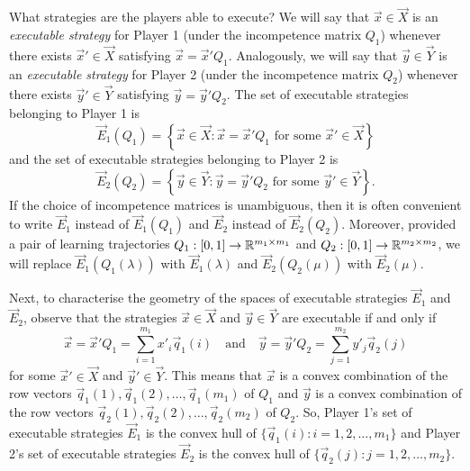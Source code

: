     What strategies are the players able to execute?
    We will say that $\vec{x} \in \vec{X}$ is an \emph{executable strategy} for Player 1 (under the incompetence matrix $Q_1$) whenever there exists $\vec{x}' \in \vec{X}$ satisfying $\vec{x} = \vec{x}' Q_1$.
    Analogously, we will say that $\vec{y} \in \vec{Y}$ is an \emph{executable strategy} for Player 2 (under the incompetence matrix $Q_2$) whenever there exists $\vec{y}' \in \vec{Y}$ satisfying $\vec{y} = \vec{y}' Q_2$.
    The set of executable strategies belonging to Player 1 is
    \begin{equation} \label{eq:executable-strategies-1}
        \vec{E}_1(Q_1)
            = \left\{
                \vec{x} \in \vec{X}
                : \vec{x} = \vec{x}' Q_1 \text{ for some } \vec{x}' \in \vec{X}
            \right\}
    \end{equation}
    and the set of executable strategies belonging to Player 2 is
    \begin{equation} \label{eq:executable-strategies-2}
        \vec{E}_2(Q_2)
            = \left\{
                \vec{y} \in \vec{Y}
                : \vec{y} = \vec{y}' Q_2 \text{ for some } \vec{y}' \in \vec{Y}
            \right\}.
    \end{equation}
    If the choice of incompetence matrices is unambiguous, then it is often convenient to write $\vec{E}_1$ instead of $\vec{E}_1(Q_1)$ and $\vec{E}_2$ instead of $\vec{E}_2(Q_2)$.
    Moreover, provided a pair of learning trajectories $Q_1 : [0, 1] \to \mathbb{R}^{m_1 \times m_1}$ and $Q_2 : [0, 1] \to \mathbb{R}^{m_2 \times m_2}$, we will replace $\vec{E}_1(Q_1(\lambda))$ with $\vec{E}_1(\lambda)$ and $\vec{E}_2(Q_2(\mu))$ with $\vec{E}_2(\mu)$.

    Next, to characterise the geometry of the spaces of executable strategies $\vec{E}_1$ and $\vec{E}_2$, observe that the strategies $\vec{x} \in \vec{X}$ and $\vec{y} \in \vec{Y}$ are executable if and only if
    \[
        \vec{x}
            = \vec{x}' Q_1
            = \sum_{i = 1}^{m_1} x'_i \vec{q}_1(i)
        \quad\text{and}\quad
        \vec{y}
            = \vec{y}' Q_2
            = \sum_{j = 1}^{m_2} y'_j \vec{q}_2(j)
    \]
    for some $\vec{x}' \in \vec{X}$ and $\vec{y}' \in \vec{Y}$.
    This means that $\vec{x}$ is a convex combination of the row vectors $\vec{q}_1(1), \vec{q}_1(2), \ldots, \vec{q}_1(m_1)$ of $Q_1$ and $\vec{y}$ is a convex combination of the row vectors $\vec{q}_2(1), \vec{q}_2(2), \ldots, \vec{q}_2(m_2)$ of $Q_2$.
    So, Player 1's set of executable strategies $\vec{E}_1$ is the convex hull of $\{\vec{q}_1(i) : i = 1, 2, \ldots, m_1\}$ and Player 2's set of executable strategies $\vec{E}_2$ is the convex hull of $\{\vec{q}_2(j) : j = 1, 2, \ldots, m_2\}$.

